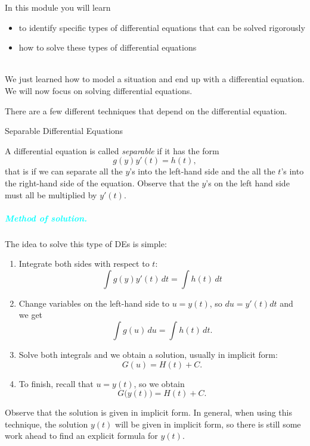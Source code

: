 In this module you will learn
\begin{itemize}
	\item to identify specific types of differential equations that can be solved rigorously
	\item how to solve these types of differential equations
\end{itemize}

\hfill \\

We just learned how to model a situation and end up with a differential equation.
We will now focus on solving differential equations. 

There are a few different techniques that depend on the differential equation. 

\hfill

\begin{submodule}{Separable Differential Equations}

\begin{definition}
A differential equation is called \emph{separable} if it has the form
$$
g(y) y'(t) = h(t),
$$
that is if we can separate all the $y$'s into the left-hand side and the all the $t$'s into the right-hand side of the equation. Observe that the $y$'s on the left hand side must all be multiplied by $y'(t)$. 
\end{definition}


\subparagraph{\textcolor{cyan}{Method of solution. }} The idea to solve this type of DEs is simple:
\begin{enumerate}[label={\bf \arabic*. } ]
\item Integrate both sides with respect to $t$:
$$
\int g(y) y'(t) \, dt = \int h(t) \, dt
$$

\item Change variables on the left-hand side to $u = y(t)$, so $du = y'(t) dt$ and we get
$$
\int g(u) \, du = \int h(t) \, dt.
$$

\item Solve both integrals and we obtain a solution, usually in implicit form:
$$
G(u) = H(t) + C.
$$

\item To finish, recall that $u=y(t)$, so we obtain
$$
G\big(y(t)\big) = H(t) + C.
$$
\end{enumerate}

\begin{important}
	Observe that the solution is given in implicit form. In general, when using this technique, the solution $y(t)$ will be given in implicit form, so there is still some work ahead to find an explicit formula for $y(t)$.	
\end{important}




\end{submodule}
